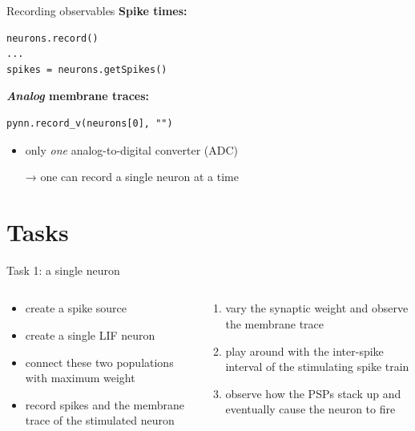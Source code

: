 \documentclass[aspectratio=169]{beamer}
\begin{document}
\begin{frame}[fragile]{Recording observables}
	\textbf{Spike times:}
	\begin{verbatim}
neurons.record()
...
spikes = neurons.getSpikes()
	\end{verbatim}

	\vspace{3ex}

	\textbf{\emph{Analog} membrane traces:}
	\begin{verbatim}
pynn.record_v(neurons[0], "")
	\end{verbatim}
	\begin{itemize}
		\item only \emph{one} analog-to-digital converter (ADC)
		\item[→] one can record a single neuron at a time
	\end{itemize}
\end{frame}

\section{Tasks}

\begin{frame}{Task 1: a single neuron}
	\begin{columns}[onlytextwidth]
		\begin{column}{0.48\textwidth}
			\begin{center}
			\end{center}

			\begin{itemize}
				\item create a spike source
				\item create a single LIF neuron
				\item connect these two populations with maximum weight
				\item record spikes and the membrane trace of the stimulated neuron
			\end{itemize}
		\end{column}
		\hfill
		\begin{column}{0.48\textwidth}
			\begin{enumerate}
				\item vary the synaptic weight and observe the membrane trace
				\item play around with the inter-spike interval of the stimulating spike train
				\item observe how the PSPs stack up and eventually cause the neuron to fire
			\end{enumerate}
		\end{column}
	\end{columns}
\end{frame}
\end{document}
